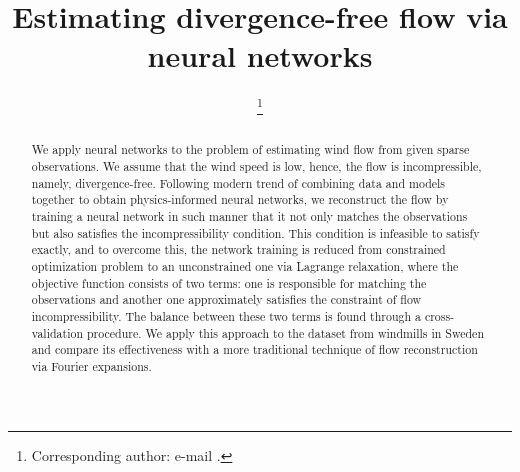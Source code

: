 \documentclass[pamm,a4paper,fleqn]{w-art}
\begin{document}

\TitleLanguage[EN]
\title[Divergence-free neural networks]{Estimating divergence-free flow via
  neural networks}

\author{ %
\footnote{Corresponding author:
  e-mail .}} 
\author{ }
\author{ }
\author{ }

\address[\inst{1}]{\CountryCode[DE]RWTH Aachen University, Pontdriesch 14--16,
  Aachen 52062, Germany}
\address[\inst{2}]{\CountryCode[SE]KTH Royal Institute of Technology,
  SE-100 44 Stockholm, Sweden}
\address[\inst{3}]{\CountryCode[SA]King Abdullah University of Science and
  Technology, Thuwal, 23955-6900, Saudi Arabia}
\AbstractLanguage[EN]
\begin{abstract}
We apply neural networks to the problem of estimating wind flow from given
sparse observations.
We assume that the wind speed is low, hence, the flow is incompressible,
namely, divergence-free.
Following modern trend of combining data and models together to obtain
physics-informed neural networks, we reconstruct the flow by training a neural
network in such manner that it not
only matches the observations but also satisfies the incompressibility condition.
This condition is infeasible to satisfy exactly, and to overcome this,
the network training is reduced from constrained optimization
problem to an unconstrained one via
Lagrange relaxation, where the objective function consists of two terms: one is
responsible for matching the observations and another one approximately
satisfies the constraint of flow incompressibility.
The balance between these
two terms is found through a cross-validation procedure.  We apply this
approach to the dataset from windmills in Sweden and compare its effectiveness
with a more traditional technique of flow reconstruction via Fourier
expansions.
\end{abstract}
\maketitle                   %
\end{document}
